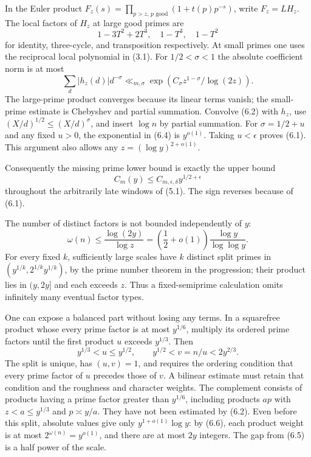 \documentclass[11pt]{article}
\begin{document}
In the Euler product $F_z(s)=\prod_{p>z,\,p\text{ good}}(1+t(p)p^{-s})$, write $F_z=L H_z$. The local factors of $H_z$ at large good primes are
\[
 1-3T^2+2T^3,\quad1-T^3,\quad1-T^2
 \tag{6.3}
\]
for identity, three-cycle, and transposition respectively. At small primes one uses the reciprocal local polynomial in (3.1). For $1/2<\sigma<1$ the absolute coefficient norm is at most
\[
 \sum_d|h_z(d)|d^{-\sigma}
 \ll_{m,\sigma}\exp\left(C_\sigma z^{1-\sigma}/\log(2z)\right).
 \tag{6.4}
\]
The large-prime product converges because its linear terms vanish; the small-prime estimate is Chebyshev and partial summation. Convolve (6.2) with $h_z$, use $(X/d)^{1/2}\le(X/d)^\sigma$, and insert $\log n$ by partial summation. For $\sigma=1/2+u$ and any fixed $u>0$, the exponential in (6.4) is $y^{o(1)}$. Taking $u<\epsilon$ proves (6.1). This argument also allows any $z=(\log y)^{2+o(1)}$.

Consequently the missing prime lower bound is exactly the upper bound
\[
 C_m(y)\le C_{m,\epsilon,\delta}y^{1/2+\epsilon}
 \tag{6.5}
\]
throughout the arbitrarily late windows of (5.1). The sign reverses because of (6.1).

The number of distinct factors is not bounded independently of $y$:
\[
 \omega(n)\le\frac{\log(2y)}{\log z}
       =\left(\frac12+o(1)\right)\frac{\log y}{\log\log y}.
 \tag{6.6}
\]
For every fixed $k$, sufficiently large scales have $k$ distinct split primes in $(y^{1/k},2^{1/k}y^{1/k})$, by the prime number theorem in the progression; their product lies in $(y,2y]$ and each exceeds $z$. Thus a fixed-semiprime calculation omits infinitely many eventual factor types.

One can expose a balanced part without losing any terms. In a squarefree product whose every prime factor is at most $y^{1/6}$, multiply its ordered prime factors until the first product $u$ exceeds $y^{1/3}$. Then
\[
 y^{1/3}<u\le y^{1/2},\qquad y^{1/2}<v=n/u<2y^{2/3}.
 \tag{6.7}
\]
The split is unique, has $(u,v)=1$, and requires the ordering condition that every prime factor of $u$ precedes those of $v$. A bilinear estimate must retain that condition and the roughness and character weights. The complement consists of products having a prime factor greater than $y^{1/6}$, including products $ap$ with $z<a\le y^{1/3}$ and $p\asymp y/a$. They have not been estimated by (6.2). Even before this split, absolute values give only $y^{1+o(1)}\log y$: by (6.6), each product weight is at most $2^{\omega(n)}=y^{o(1)}$, and there are at most $2y$ integers. The gap from (6.5) is a half power of the scale.
\end{document}
